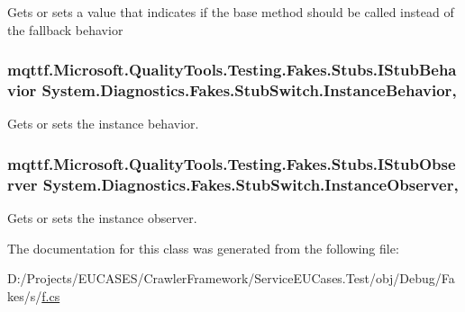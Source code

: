 Gets or sets a value that indicates if the base method should be called instead of the fallback behavior

\hypertarget{class_system_1_1_diagnostics_1_1_fakes_1_1_stub_switch_a4229102eb0e757ef7444c04889f0f2e5}{
\subsubsection[{Instance\-Behavior}]{\setlength{\rightskip}{0pt plus 5cm}mqttf.\-Microsoft.\-Quality\-Tools.\-Testing.\-Fakes.\-Stubs.\-I\-Stub\-Behavior System.\-Diagnostics.\-Fakes.\-Stub\-Switch.\-Instance\-Behavior\hspace{0.3cm}{\ttfamily [get]}, {\ttfamily [set]}}}\label{class_system_1_1_diagnostics_1_1_fakes_1_1_stub_switch_a4229102eb0e757ef7444c04889f0f2e5}


Gets or sets the instance behavior.

\hypertarget{class_system_1_1_diagnostics_1_1_fakes_1_1_stub_switch_aae12862da96176cc2cb376d5f3398077}{
\subsubsection[{Instance\-Observer}]{\setlength{\rightskip}{0pt plus 5cm}mqttf.\-Microsoft.\-Quality\-Tools.\-Testing.\-Fakes.\-Stubs.\-I\-Stub\-Observer System.\-Diagnostics.\-Fakes.\-Stub\-Switch.\-Instance\-Observer\hspace{0.3cm}{\ttfamily [get]}, {\ttfamily [set]}}}\label{class_system_1_1_diagnostics_1_1_fakes_1_1_stub_switch_aae12862da96176cc2cb376d5f3398077}


Gets or sets the instance observer.



The documentation for this class was generated from the following file\-:\begin{DoxyCompactItemize}
\item 
D\-:/\-Projects/\-E\-U\-C\-A\-S\-E\-S/\-Crawler\-Framework/\-Service\-E\-U\-Cases.\-Test/obj/\-Debug/\-Fakes/s/\hyperlink{s_2f_8cs}{f.\-cs}\end{DoxyCompactItemize}
